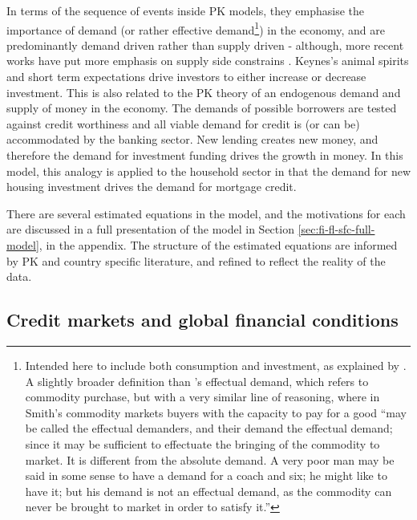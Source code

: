 \documentclass[
]{book}
\begin{document}
In terms of the sequence of events inside PK models, they emphasise the importance of demand (or rather effective demand\footnote{Intended here to include both consumption and investment, as explained by \citet{keynes1937}. A slightly broader definition than \citet[pp.~73]{Smith1776}'s effectual demand, which refers to commodity purchase, but with a very similar line of reasoning, where in Smith's commodity markets buyers with the capacity to pay for a good ``may be called the effectual demanders, and their demand the effectual demand; since it may be sufficient to effectuate the bringing of the commodity to market. It is different from the absolute demand. A very poor man may be said in some sense to have a demand for a coach and six; he might like to have it; but his demand is not an effectual demand, as the commodity can never be brought to market in order to satisfy it.''}) in the economy, and are predominantly demand driven rather than supply driven - although, more recent works have put more emphasis on supply side constrains \citep{skott2008supplyside}. Keynes's animal spirits and short term expectations drive investors to either increase or decrease investment. This is also related to the PK theory of an endogenous demand and supply of money in the economy. The demands of possible borrowers are tested against credit worthiness and all viable demand for credit is (or can be) accommodated by the banking sector. New lending creates new money, and therefore the demand for investment funding drives the growth in money. In this model, this analogy is applied to the household sector in that the demand for new housing investment drives the demand for mortgage credit.

There are several estimated equations in the model, and the motivations for each are discussed in a full presentation of the model in Section \ref{sec:fi-fl-sfc-full-model}, in the appendix. The structure of the estimated equations are informed by PK and country specific literature, and refined to reflect the reality of the data.

\hypertarget{credit-markets-and-global-financial-conditions}{%
\subsection{Credit markets and global financial conditions}\label{credit-markets-and-global-financial-conditions}}
\end{document}
